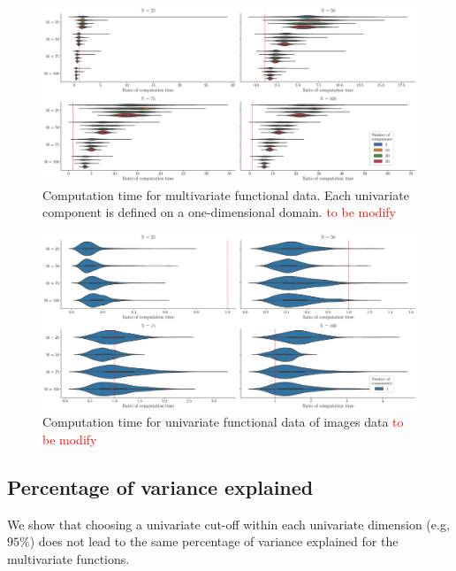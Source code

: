 \begin{figure}
    \centering
    \includegraphics[scale=0.25]{figures/computation_time_pall.eps}
    \caption{Computation time for multivariate functional data. Each univariate component is defined on a one-dimensional domain. \textcolor{red}{to be modify}}
    \label{fig:computation_time_mfd_1d}
\end{figure}

\begin{figure}
    \centering
    \includegraphics[scale=0.25]{figures/computation_time_p1.eps}
    \caption{Computation time for univariate functional data of images data \textcolor{red}{to be modify}}
    \label{fig:computation_time_fd_2d}
\end{figure}




\subsection{Percentage of variance explained} %
\label{sub:percentage_of_variance_explained_simulation}

We show that choosing a univariate cut-off within each univariate dimension (e.g, $95\%$) does not lead to the same percentage of variance explained for the multivariate functions.

